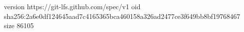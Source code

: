 version https://git-lfs.github.com/spec/v1
oid sha256:2a6e0df124645aad7c4165365bca460158a326ad2477ce3f649bb8bf19768467
size 86105

